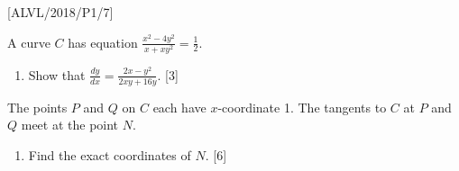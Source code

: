 \item {[}ALVL/2018/P1/7{]}

A curve $C$ has equation $\frac{x^{2}-4y^{2}}{x+xy^{2}}=\frac{1}{2}$. 
\begin{enumerate}
\item Show that $\frac{dy}{dx}=\frac{2x-y^{2}}{2xy+16y}$.\hfill{} {[}3{]}
\end{enumerate}
The points $P$ and $Q$ on $C$ each have $x$-coordinate 1. The
tangents to $C$ at $P$ and $Q$ meet at the point $N$. 
\begin{enumerate}
\item Find the exact coordinates of $N$. \hfill{}{[}6{]}
\end{enumerate}
